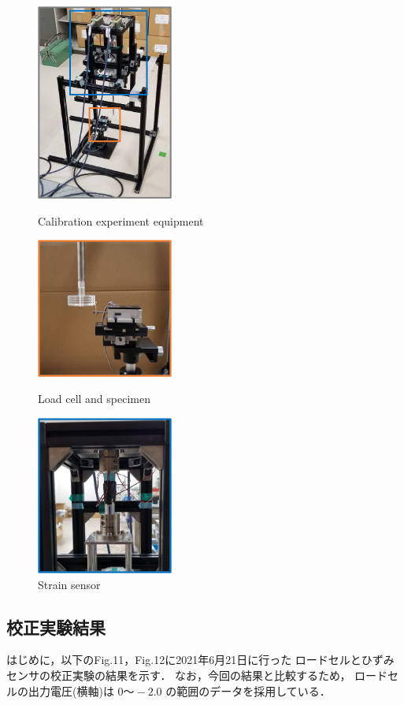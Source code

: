 \documentclass[twocolumn,a4j]{jsarticle}
\begin{document}
\begin{figure}[htbp]
    \footnotesize
    \begin{center}
        \includegraphics[width=45mm]{../images/image_05.png}
        \caption{Calibration experiment equipment}
        \includegraphics[width=45mm]{../images/image_06.png}
        \caption{Load cell and specimen}
        \includegraphics[width=45mm]{../images/image_07.png}
        \caption{Strain sensor}
    \end{center}
\end{figure}

\newpage

\subsection{校正実験結果}
はじめに，以下のFig.11，Fig.12に2021年6月21日に行った
ロードセルとひずみセンサの校正実験の結果を示す．
なお，今回の結果と比較するため，
ロードセルの出力電圧(横軸)は $0 ～ -2.0$ の範囲のデータを採用している．\\
\end{document}

